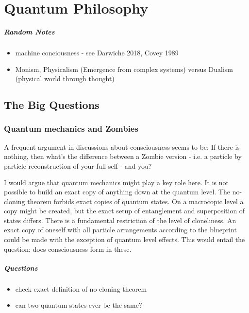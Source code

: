 \chapter[Quantum Philosophy]{Quantum Philosophy}
\label{ch:quaphil}

\paragraph{Random Notes}
\begin{itemize}
  \item machine conciousness - see Darwiche 2018, Covey 1989
  \item Monism, Physicalism (Emergence from complex systems) versus Dualism
(physical world through thought) \end{itemize}


\section{The Big Questions}
\subsection{Quantum mechanics and Zombies}
A frequent argument in discussions about consciousness seems to be: If there is
nothing, then what's the difference between a Zombie version - i.e. a particle
by particle reconstruction of your full self - and you?\par
I would argue that quantum mechanics might play a key role here. It is not
possible to build an exact copy of anything down at the quantum level. The
no-cloning theorem forbids exact copies of quantum states. On a macrocopic level
a copy might be created, but the exact setup of entanglement and superposition
of states differs. There is a fundamental restriction of the level of
cloneliness. An exact copy of oneself with all particle arrangements according
to the blueprint could be made with the exception of quantum level effects.
This would entail the question: does consciousness form in these.

\paragraph{Questions}
\begin{itemize}
  \item check exact definition of no cloning theorem
  \item can two quantum states ever be the same?
\end{itemize}

